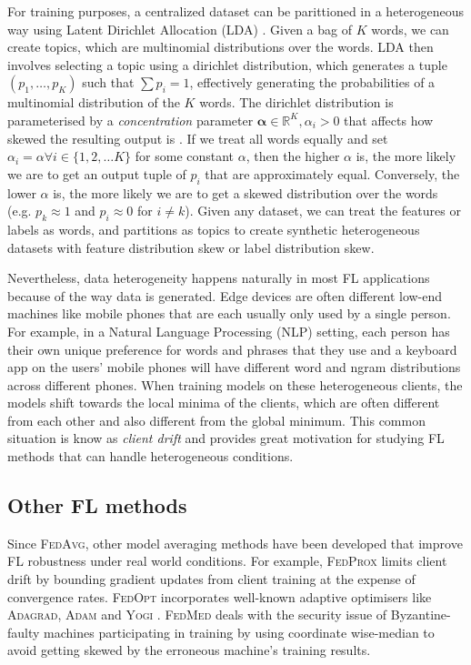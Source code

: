 \documentclass{article}
\newcommand*{\fedavg}{\textsc{FedAvg}}
\begin{document}
For training purposes, a centralized dataset can be parittioned in a heterogeneous way using Latent Dirichlet Allocation (LDA) \cite{bleiLatentDirichletAllocation2003a}. Given a bag of $K$ words, we can create topics, which are multinomial distributions over the words. LDA then involves selecting a topic using a dirichlet distribution, which generates a tuple $(p_1,\ldots,p_K)$ such that $\sum p_i=1$, effectively generating the probabilities of a multinomial distribution of the $K$ words. The dirichlet distribution is parameterised by a \emph{concentration} parameter $\bm{\alpha} \in \mathbb{R}^{K}, \alpha_i > 0$ that affects how skewed the resulting output is \cite{frigyikIntroductionDirichletDistribution2010}. If we treat all words equally and set $\alpha_i=\alpha\forall i\in \{1,2,\ldots K\}$  for some constant $\alpha$, then the higher $\alpha$ is, the more likely we are to get an output tuple of $p_i$ that are approximately equal. Conversely, the lower $\alpha$ is, the more likely we are to get a skewed distribution over the words (e.g. $p_k\approx 1$ and $p_i\approx 0$ for $i\neq k$). Given any dataset, we can treat the features or labels as words, and partitions as topics to create synthetic heterogeneous datasets with feature distribution skew or label distribution skew.

Nevertheless, data heterogeneity happens naturally in most FL applications because of the way data is generated. Edge devices are often different low-end machines like mobile phones that are each usually only used by a single person. For example, in a Natural Language Processing (NLP) setting, each person has their own unique preference for words and phrases \cite{fallahPersonalizedFederatedLearning2020} that they use and a keyboard app on the users' mobile phones will have different word and ngram distributions across different phones. When training models on these heterogeneous clients, the models shift towards the local minima of the clients, which are often different from each other and also different from the global minimum. This common situation is know as \emph{client drift} and provides great motivation for studying FL methods that can handle heterogeneous conditions.

\subsection{Other FL methods}
Since \fedavg{}, other model averaging methods have been developed that improve FL robustness under real world conditions. For example, \textsc{FedProx} \cite{liFederatedOptimizationHeterogeneous2020} limits client drift by bounding gradient updates from client training at the expense of convergence rates. \textsc{FedOpt} \cite{reddiAdaptiveFederatedOptimization2021} incorporates well-known adaptive optimisers like \textsc{Adagrad}, \textsc{Adam} and \textsc{Yogi} \cite{duchiAdaptiveSubgradientMethods2011,kingmaAdamMethodStochastic2017,zaheerAdaptiveMethodsNonconvex2018}.  \textsc{FedMed} deals with the security issue of Byzantine-faulty machines participating in training by using coordinate wise-median to avoid getting skewed by the erroneous machine's training results.
\end{document}
